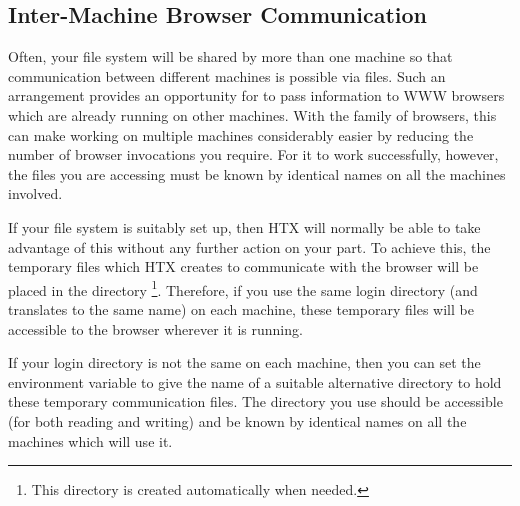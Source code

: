 \subsection{\label{sect:intermachinecommunication}Inter-Machine Browser Communication}

Often, your file system will be shared by more than one machine so
that communication between different machines is possible via
files. Such an arrangement provides an opportunity for
 to pass information to WWW browsers which are
already running on other machines. With the
 family of browsers, this can make working on
multiple machines considerably easier by reducing the number of browser
invocations you require. For it to work successfully, however, the
files you are accessing must be known by identical names on all the
machines involved.

If your file system is suitably set up, then HTX will normally be able
to take advantage of this without any further action on your part. To
achieve this, the temporary files which HTX creates to communicate
with the browser will be placed in the directory
\footnote{This directory is created automatically
when needed.}. Therefore, if you use the same login directory (and
 translates to the same name) on each machine, these
temporary files will be accessible to the browser wherever it is
running.

If your login directory is not the same on each machine, then you can
set the environment variable  to give the name of a
suitable alternative directory to hold these temporary communication
files. The directory you use should be accessible (for both reading
and writing) and be known by identical names on all the machines which
will use it.


